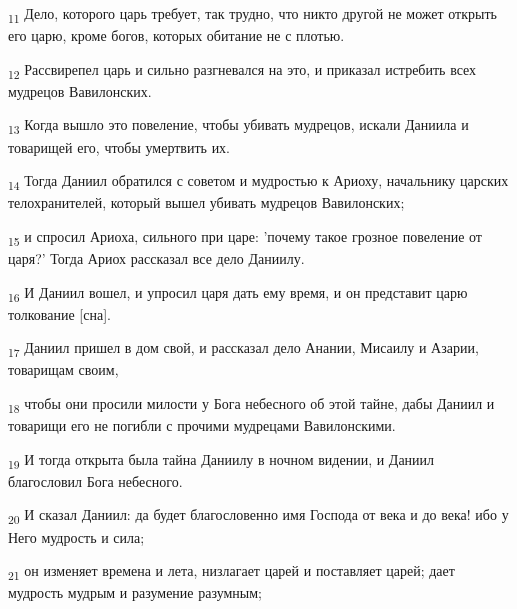 \begin{tcolorbox}
\textsubscript{11} Дело, которого царь требует, так трудно, что никто другой не может открыть его царю, кроме богов, которых обитание не с плотью.
\end{tcolorbox}
\begin{tcolorbox}
\textsubscript{12} Рассвирепел царь и сильно разгневался на это, и приказал истребить всех мудрецов Вавилонских.
\end{tcolorbox}
\begin{tcolorbox}
\textsubscript{13} Когда вышло это повеление, чтобы убивать мудрецов, искали Даниила и товарищей его, чтобы умертвить их.
\end{tcolorbox}
\begin{tcolorbox}
\textsubscript{14} Тогда Даниил обратился с советом и мудростью к Ариоху, начальнику царских телохранителей, который вышел убивать мудрецов Вавилонских;
\end{tcolorbox}
\begin{tcolorbox}
\textsubscript{15} и спросил Ариоха, сильного при царе: 'почему такое грозное повеление от царя?' Тогда Ариох рассказал все дело Даниилу.
\end{tcolorbox}
\begin{tcolorbox}
\textsubscript{16} И Даниил вошел, и упросил царя дать ему время, и он представит царю толкование [сна].
\end{tcolorbox}
\begin{tcolorbox}
\textsubscript{17} Даниил пришел в дом свой, и рассказал дело Анании, Мисаилу и Азарии, товарищам своим,
\end{tcolorbox}
\begin{tcolorbox}
\textsubscript{18} чтобы они просили милости у Бога небесного об этой тайне, дабы Даниил и товарищи его не погибли с прочими мудрецами Вавилонскими.
\end{tcolorbox}
\begin{tcolorbox}
\textsubscript{19} И тогда открыта была тайна Даниилу в ночном видении, и Даниил благословил Бога небесного.
\end{tcolorbox}
\begin{tcolorbox}
\textsubscript{20} И сказал Даниил: да будет благословенно имя Господа от века и до века! ибо у Него мудрость и сила;
\end{tcolorbox}
\begin{tcolorbox}
\textsubscript{21} он изменяет времена и лета, низлагает царей и поставляет царей; дает мудрость мудрым и разумение разумным;
\end{tcolorbox}
